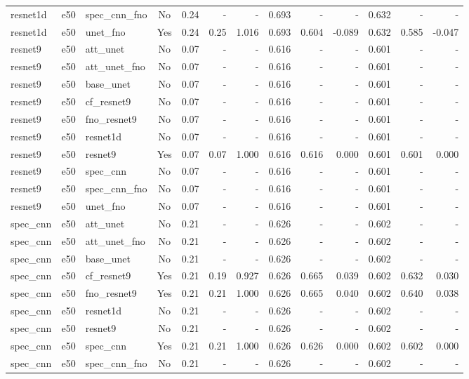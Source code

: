 \begin{tabular}{l l l c r r r r r r r r r}
resnet1d & e50 & spec_cnn_fno & No & 0.24 & - & - & 0.693 & - & - & 0.632 & - & - \\
resnet1d & e50 & unet_fno & Yes & 0.24 & 0.25 & 1.016 & 0.693 & 0.604 & -0.089 & 0.632 & 0.585 & -0.047 \\
resnet9 & e50 & att_unet & No & 0.07 & - & - & 0.616 & - & - & 0.601 & - & - \\
resnet9 & e50 & att_unet_fno & No & 0.07 & - & - & 0.616 & - & - & 0.601 & - & - \\
resnet9 & e50 & base_unet & No & 0.07 & - & - & 0.616 & - & - & 0.601 & - & - \\
resnet9 & e50 & cf_resnet9 & No & 0.07 & - & - & 0.616 & - & - & 0.601 & - & - \\
resnet9 & e50 & fno_resnet9 & No & 0.07 & - & - & 0.616 & - & - & 0.601 & - & - \\
resnet9 & e50 & resnet1d & No & 0.07 & - & - & 0.616 & - & - & 0.601 & - & - \\
resnet9 & e50 & resnet9 & Yes & 0.07 & 0.07 & 1.000 & 0.616 & 0.616 & 0.000 & 0.601 & 0.601 & 0.000 \\
resnet9 & e50 & spec_cnn & No & 0.07 & - & - & 0.616 & - & - & 0.601 & - & - \\
resnet9 & e50 & spec_cnn_fno & No & 0.07 & - & - & 0.616 & - & - & 0.601 & - & - \\
resnet9 & e50 & unet_fno & No & 0.07 & - & - & 0.616 & - & - & 0.601 & - & - \\
spec_cnn & e50 & att_unet & No & 0.21 & - & - & 0.626 & - & - & 0.602 & - & - \\
spec_cnn & e50 & att_unet_fno & No & 0.21 & - & - & 0.626 & - & - & 0.602 & - & - \\
spec_cnn & e50 & base_unet & No & 0.21 & - & - & 0.626 & - & - & 0.602 & - & - \\
spec_cnn & e50 & cf_resnet9 & Yes & 0.21 & 0.19 & 0.927 & 0.626 & 0.665 & 0.039 & 0.602 & 0.632 & 0.030 \\
spec_cnn & e50 & fno_resnet9 & Yes & 0.21 & 0.21 & 1.000 & 0.626 & 0.665 & 0.040 & 0.602 & 0.640 & 0.038 \\
spec_cnn & e50 & resnet1d & No & 0.21 & - & - & 0.626 & - & - & 0.602 & - & - \\
spec_cnn & e50 & resnet9 & No & 0.21 & - & - & 0.626 & - & - & 0.602 & - & - \\
spec_cnn & e50 & spec_cnn & Yes & 0.21 & 0.21 & 1.000 & 0.626 & 0.626 & 0.000 & 0.602 & 0.602 & 0.000 \\
spec_cnn & e50 & spec_cnn_fno & No & 0.21 & - & - & 0.626 & - & - & 0.602 & - & - \\

\end{tabular}
